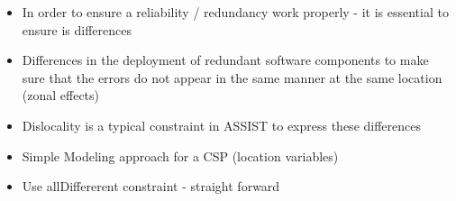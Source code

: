 \documentclass[english,biblatex]{lni}
\begin{document}
\begin{itemize}
\item In order to ensure a reliability / redundancy work properly - it is essential to ensure is differences
\item Differences in the deployment of redundant software components to make sure that the errors do not appear in the same manner at the same location (zonal effects)
\item Dislocality is a typical constraint in ASSIST to express these differences
\item Simple Modeling approach for a CSP (location variables)
\item Use allDiffererent constraint - straight forward
\end{itemize}

\printbibliography[heading=bibintoc]
\end{document}
